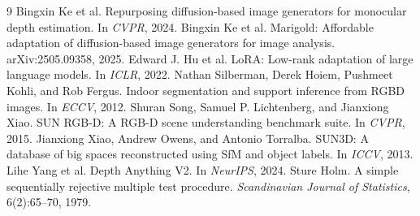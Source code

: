 {\small
\begin{thebibliography}{9}
 Bingxin Ke et al. Repurposing diffusion-based image generators for monocular depth estimation. In \emph{CVPR}, 2024.
 Bingxin Ke et al. Marigold: Affordable adaptation of diffusion-based image generators for image analysis. arXiv:2505.09358, 2025.
 Edward J. Hu et al. LoRA: Low-rank adaptation of large language models. In \emph{ICLR}, 2022.
 Nathan Silberman, Derek Hoiem, Pushmeet Kohli, and Rob Fergus. Indoor segmentation and support inference from RGBD images. In \emph{ECCV}, 2012.
 Shuran Song, Samuel P. Lichtenberg, and Jianxiong Xiao. SUN RGB-D: A RGB-D scene understanding benchmark suite. In \emph{CVPR}, 2015.
 Jianxiong Xiao, Andrew Owens, and Antonio Torralba. SUN3D: A database of big spaces reconstructed using SfM and object labels. In \emph{ICCV}, 2013.
 Lihe Yang et al. Depth Anything V2. In \emph{NeurIPS}, 2024.
 Sture Holm. A simple sequentially rejective multiple test procedure. \emph{Scandinavian Journal of Statistics}, 6(2):65--70, 1979.
\end{thebibliography}}

